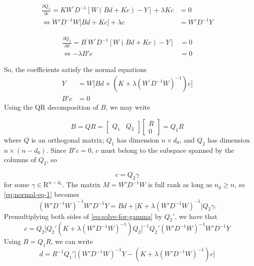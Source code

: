 \documentclass[12pt]{article}
\theoremstyle{definition}
\begin{document}
\begin{align}
\frac{\partial Q_\lambda}{\partial c} = K W^\prime D^{-1}\left[ W\left(Bd + Kc\right) - Y  \right] + \lambda Kc &= 0 \nonumber \\
\iff    W'D^{-1} W \bigg[ Bd + Kc \bigg] + \lambda c  &= W' D^{-1}Y \label{eq:normal-eq-1}
\end{align}
\noindent

\begin{align*}
\frac{\partial Q_\lambda}{\partial d} = B^\prime W^\prime D^{-1}\left[ W\left(Bd + Kc\right) - Y  \right] &=0 \nonumber \\
\iff   - \lambda B' c  &= 0  
\end{align*}
\noindent

So, the coefficients satisfy the normal equations
\begin{align} 
Y &= W \bigg[ Bd + \left(K  + \lambda \left(W^\prime D^{-1} W \right)^{-1} \right) c \bigg] \label{eq:simple-normal-eq-1} \\
B' c  &= 0  \label{eq:simple-normal-eq-2}
\end{align}
\noindent
Using the QR decomposition of $B$, we may write 

\begin{equation*}
B = QR = \begin{bmatrix} Q_1 &  Q_2 \end{bmatrix} \begin{bmatrix} R \\  0 \end{bmatrix} = Q_1 R
\end{equation*}
\noindent
where $Q$ is an orthogonal matrix; $Q_1$ has dimension $n \times d_0$,  and $Q_2$ has dimension $n \times \left(n-d_0\right)$. Since $B'c = 0$, $c$ must belong to the subspace spanned by the columns of $Q_2$, so 

\[
c = Q_2 \gamma
\] 
\noindent
for some $\gamma \in \mathrm{R}^{n-d_0}$. The matrix $M = W' D^{-1} W$ is full rank as long as $n_y \ge n$, so \ref{eq:normal-eq-1} becomes
\begin{equation} \label{eq:solve-for-gamma}
\left(W'D^{-1}W\right)^{-1} W' D^{-1}Y =  Bd + \bigg[K + \lambda \left(W'D^{-1}W\right)^{-1}  \bigg]  Q_2 \gamma. 
\end{equation}
\noindent
Premultiplying both sides of \ref{eq:solve-for-gamma} by $Q_2'$, we have that
\begin{equation} \label{eq:solve-for-c}
c = Q_2 \bigg[ Q_2' \left( K + \lambda \left( W'D^{-1} W \right)^{-1} \right)Q_2 \bigg]^{-1} Q_2' \left( W'D^{-1} W \right)^{-1}W'D^{-1} Y
\end{equation}
\noindent
Using $B = Q_1 R$, we can write
\begin{equation} \label{eq:solve-for-d}
d = R^{-1} Q_1' \bigg[ \left( W'D^{-1} W \right)^{-1} Y - \left( K + \lambda \left( W'D^{-1} W \right)^{-1} \right) c  \bigg]
\end{equation}




\end{document}
